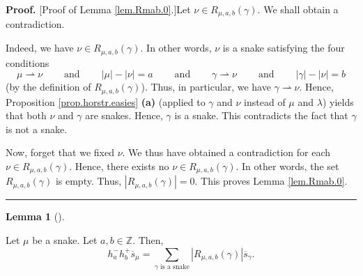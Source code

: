 \documentclass[numbers=enddot,12pt,final,onecolumn,notitlepage]{scrartcl}%
\theoremstyle{definition}
\newtheorem{lem}[theo]{Lemma}
\newenvironment{lemma}[1][]
{\begin{lem}[#1]\begin{leftbar}}
{\end{leftbar}\end{lem}}
\newenvironment{proof}[1][Proof]{\noindent\textbf{#1.} }{\ \rule{0.5em}{0.5em}}
\let\sumnonlimits\sum
\renewcommand{\sum}{\sumnonlimits\limits}
\begin{document}
\begin{proof}
[Proof of Lemma \ref{lem.Rmab.0}.]Let $\nu\in R_{\mu,a,b}\left(
\gamma\right)  $. We shall obtain a contradiction.

Indeed, we have $\nu\in R_{\mu,a,b}\left(  \gamma\right)  $. In other words,
$\nu$ is a snake satisfying the four conditions%
\[
\mu\rightharpoonup\nu\ \ \ \ \ \ \ \ \ \ \text{and}%
\ \ \ \ \ \ \ \ \ \ \left\vert \mu\right\vert -\left\vert \nu\right\vert
=a\ \ \ \ \ \ \ \ \ \ \text{and}\ \ \ \ \ \ \ \ \ \ \gamma\rightharpoonup
\nu\ \ \ \ \ \ \ \ \ \ \text{and}\ \ \ \ \ \ \ \ \ \ \left\vert \gamma
\right\vert -\left\vert \nu\right\vert =b
\]
(by the definition of $R_{\mu,a,b}\left(  \gamma\right)  $). Thus, in
particular, we have $\gamma\rightharpoonup\nu$. Hence, Proposition
\ref{prop.horstr.easies} \textbf{(a)} (applied to $\gamma$ and $\nu$ instead
of $\mu$ and $\lambda$) yields that both $\nu$ and $\gamma$ are snakes. Hence,
$\gamma$ is a snake. This contradicts the fact that $\gamma$ is not a snake.

Now, forget that we fixed $\nu$. We thus have obtained a contradiction for
each $\nu\in R_{\mu,a,b}\left(  \gamma\right)  $. Hence, there exists no
$\nu\in R_{\mu,a,b}\left(  \gamma\right)  $. In other words, the set
$R_{\mu,a,b}\left(  \gamma\right)  $ is empty. Thus, $\left\vert R_{\mu
,a,b}\left(  \gamma\right)  \right\vert =0$. This proves Lemma
\ref{lem.Rmab.0}.
\end{proof}

\begin{lemma}
\label{lem.Rmab.formula}Let $\mu$ be a snake. Let $a,b\in\mathbb{Z}$. Then,%
\[
h_{a}^{-}h_{b}^{+}\overline{s}_{\mu}=\sum_{\gamma\text{ is a snake}}\left\vert
R_{\mu,a,b}\left(  \gamma\right)  \right\vert \overline{s}_{\gamma}.
\]

\end{lemma}
\end{document}
